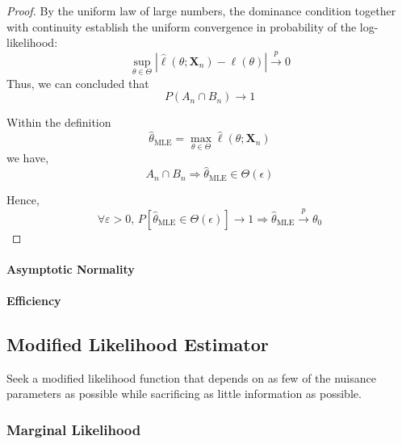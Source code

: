 \begin{proof}
    By the uniform law of large numbers, the dominance condition together with continuity establish the uniform convergence in probability of the log-likelihood:
    \begin{equation}
        \sup_{\theta\in\Theta}|\hat{\ell}(\theta;\mathbf{X}_{n})-\ell(\theta)|\stackrel{p}{\rightarrow}0
    \end{equation}
    Thus, we can concluded that
    \begin{equation}
        P\left(A_{n}\cap B_{n}\right)\rightarrow 1
    \end{equation}

    Within the definition
    \begin{equation}
        \hat{\theta}_{\text{MLE}}=\max_{\theta\in\Theta}\hat{\ell}\left(\theta;\mathbf{X}_{n}\right)
    \end{equation}
    we have,
    \begin{equation*}
        A_{n}\cap B_{n}\Longrightarrow\hat{\theta}_{\text{MLE}}\in\Theta(\epsilon)
    \end{equation*}
    
    Hence,
    \begin{equation*}
        \forall\varepsilon>0,\,P\left[\hat{\theta}_{\text{MLE}}\in\Theta(\epsilon)\right]\rightarrow 1\Longrightarrow\hat{\theta}_{\text{MLE}}\stackrel{p}{\rightarrow}\theta_{0}
    \end{equation*}
\end{proof}

\paragraph{Asymptotic Normality}

\paragraph{Efficiency}

\subsection{Modified Likelihood Estimator}

Seek a modified likelihood function that depends on as few of the nuisance parameters as possible while sacrificing as little information as possible.

\subsubsection{Marginal Likelihood}


